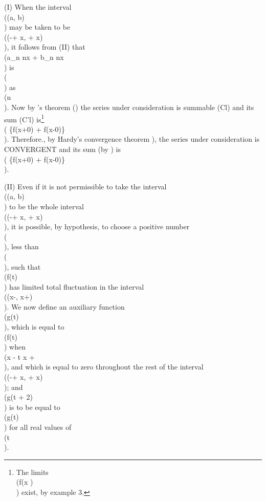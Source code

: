 (I) When the interval \\((a, b)\\) may be taken to be \\((-\pi + x, \pi + x)\\),
it follows from  (II) %
that \\(a_{n} \cos nx + b_{n} \sin nx\\) is \\(\\) as
\\(n \rightarrow \infty\\). Now by \Fejer's theorem ()
the series under consideration
is summable (Cl) %
and its sum (C'l) %
is\footnote{The limits \\(f(x )\\) exist, by  example 3.%
}
\\( \left\{f(x+0) + f(x-0)\right\}\\). Therefore.,
by Hardy's convergence theorem ), the series under consideration
is CONVERGENT %
and its sum (by ) is
\\( \left\{f(x+0) + f(x-0)\right\}\\).

(II) %
Even if it is not permissible to take the interval \\((a, b)\\) to be
the whole interval \\((-\pi + x, \pi + x)\\), it is possible, by
hypothesis, to choose a positive number \\(\delta\\), less than \\(\pi\\),
such that \\(f(t)\\)
has limited total fluctuation in the interval \\((x-\delta, x+\delta)\\).
We now define an auxiliary function \\(g(t)\\), which is equal to \\(f(t)\\) when
\\(x - \delta \leq t \leq x + \delta\\),
and which is equal to zero throughout the rest of the interval
\\((-\pi + x, \pi + x)\\); and \\(g(t + 2\pi)\\) is to be equal to \\(g(t)\\) for all real
values of \\(t\\).

